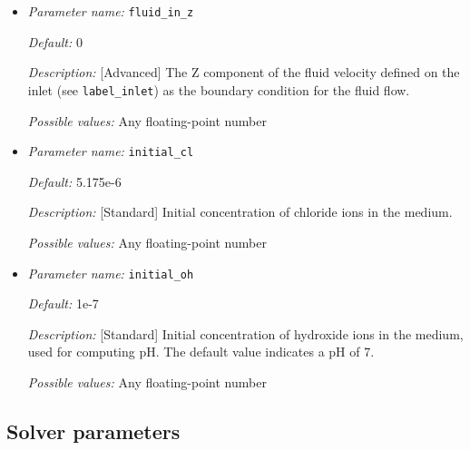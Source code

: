 \begin{itemize}

{\it Default:} 0

{\it Description:} [Advanced] The Y component of the fluid velocity defined on the inlet (see {\tt label\_inlet}) as the boundary condition for the fluid flow.

{\it Possible values:} Any floating-point number


\item {\it Parameter name:} {\tt fluid\_in\_z}
\label{parameters:fluid_in_z}


{\it Default:} 0

{\it Description:} [Advanced] The Z component of the fluid velocity defined on the inlet (see {\tt label\_inlet}) as the boundary condition for the fluid flow.

{\it Possible values:} Any floating-point number


\item {\it Parameter name:} {\tt initial\_cl}
\label{parameters:initial_cl}


{\it Default:} 5.175e-6

{\it Description:} [Standard] Initial concentration of chloride ions in the medium.

{\it Possible values:} Any floating-point number


\item {\it Parameter name:} {\tt initial\_oh}
\label{parameters:initial_oh}


{\it Default:} 1e-7

{\it Description:} [Standard] Initial concentration of hydroxide ions in the medium, used for computing pH. The default value indicates a pH of 7.

{\it Possible values:} Any floating-point number


\end{itemize}



\subsection{Solver parameters}
\label{parameters:sovler}

